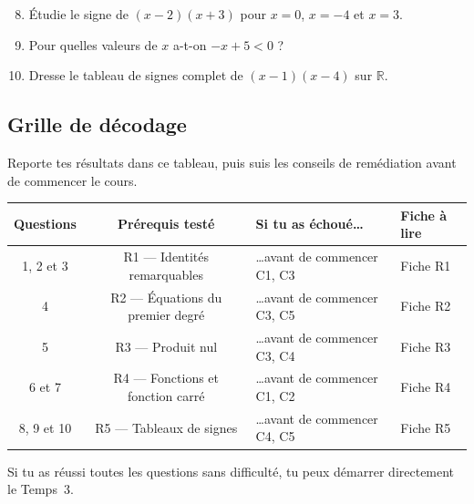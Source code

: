 \begin{enumerate}
  \setcounter{enumi}{7}

  \item Étudie le signe de $(x - 2)(x + 3)$ pour $x = 0$, $x = -4$ et $x = 3$.

  \item Pour quelles valeurs de $x$ a-t-on $-x + 5 < 0$ ?

  \item Dresse le tableau de signes complet de $(x - 1)(x - 4)$ sur $\mathbb{R}$.

\end{enumerate}

\bigskip

\subsection*{Grille de décodage}

Reporte tes résultats dans ce tableau, puis suis les conseils de remédiation avant de commencer le cours.

\begin{center}
\begin{tabular}{|c|c|l|l|}
\hline
\textbf{Questions} & \textbf{Prérequis testé} & \textbf{Si tu as échoué\ldots} & \textbf{Fiche à lire} \\
\hline
1, 2 et 3 & R1 — Identités remarquables & \ldots avant de commencer C1, C3 & Fiche R1 \\
\hline
4 & R2 — Équations du premier degré & \ldots avant de commencer C3, C5 & Fiche R2 \\
\hline
5 & R3 — Produit nul & \ldots avant de commencer C3, C4 & Fiche R3 \\
\hline
6 et 7 & R4 — Fonctions et fonction carré & \ldots avant de commencer C1, C2 & Fiche R4 \\
\hline
8, 9 et 10 & R5 — Tableaux de signes & \ldots avant de commencer C4, C5 & Fiche R5 \\
\hline
\end{tabular}
\end{center}

\bigskip

Si tu as réussi toutes les questions sans difficulté, tu peux démarrer directement le Temps~3.
